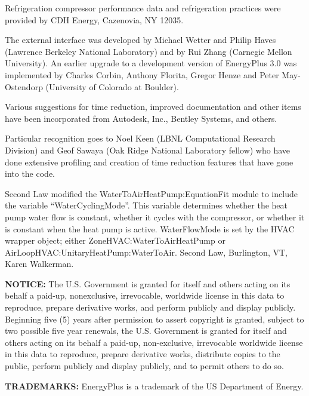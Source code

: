 Refrigeration compressor performance data and refrigeration practices were provided by CDH Energy, Cazenovia, NY 12035.

The external interface was developed by Michael Wetter and Philip Haves (Lawrence Berkeley National Laboratory) and by Rui Zhang (Carnegie Mellon University). An earlier upgrade to a development version of EnergyPlus 3.0 was implemented by Charles Corbin, Anthony Florita, Gregor Henze and Peter May-Ostendorp (University of Colorado at Boulder).

Various suggestions for time reduction, improved documentation and other items have been incorporated from Autodesk, Inc., Bentley Systems, and others.

Particular recognition goes to Noel Keen (LBNL Computational Research Division) and Geof Sawaya (Oak Ridge National Laboratory fellow) who have done extensive profiling and creation of time reduction features that have gone into the code.

Second Law modified the WaterToAirHeatPump:EquationFit module to include the variable ``WaterCyclingMode''. This variable determines whether the heat pump water flow is constant, whether it cycles with the compressor, or whether it is constant when the heat pump is active. WaterFlowMode is set by the HVAC wrapper object; either ZoneHVAC:WaterToAirHeatPump or AirLoopHVAC:UnitaryHeatPump:WaterToAir. Second Law, Burlington, VT, Karen Walkerman.

\textbf{NOTICE:} The U.S. Government is granted for itself and others acting on its behalf a paid-up, nonexclusive, irrevocable, worldwide license in this data to reproduce, prepare derivative works, and perform publicly and display publicly. Beginning five (5) years after permission to assert copyright is granted, subject to two possible five year renewals, the U.S. Government is granted for itself and others acting on its behalf a paid-up, non-exclusive, irrevocable worldwide license in this data to reproduce, prepare derivative works, distribute copies to the public, perform publicly and display publicly, and to permit others to do so.

\textbf{TRADEMARKS:} EnergyPlus is a trademark of the US Department of Energy.

